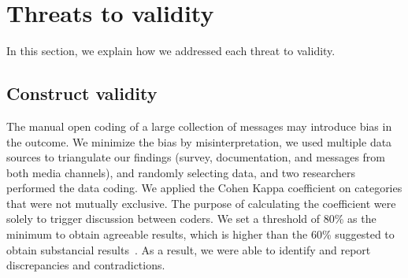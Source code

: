 \documentclass{sig-alternate-05-2015}
\begin{document}
\section{Threats to validity}
\label{cha:threats}


%

In this section, we explain how we addressed each threat to
validity.

\subsection{Construct validity}

The manual open coding of a large collection of messages may introduce bias in the outcome.
We minimize the bias by misinterpretation, we used multiple data sources to triangulate our findings (survey, documentation, and messages from both media channels), and randomly selecting data, and two researchers performed the data coding.
We applied the Cohen Kappa coefficient on categories that were not mutually exclusive.
The purpose of calculating the coefficient were solely to trigger discussion between coders.
We set a threshold of 80\% as the minimum to obtain agreeable results, which is higher than the 60\% suggested to obtain substancial results~\cite{Landis1977}.
As a result, we were able to identify and report discrepancies and contradictions.
\end{document}

